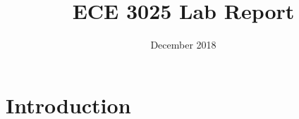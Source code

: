 \documentclass{article}
\title{ECE 3025 Lab Report}
\date{December 2018}
\begin{document}
\maketitle

\section{Introduction}
\end{document}
